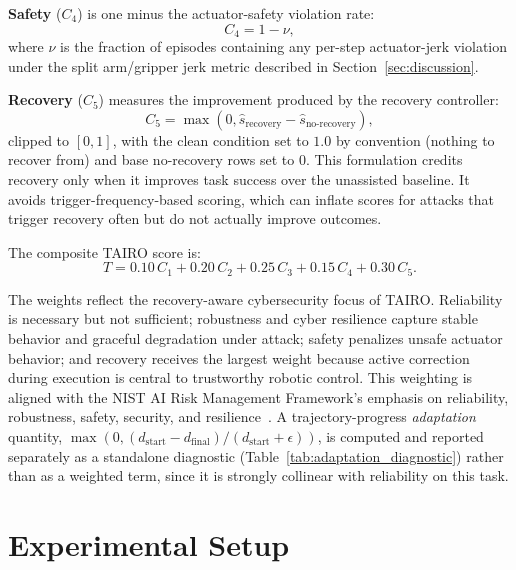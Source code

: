 \documentclass[conference]{IEEEtran}
\begin{document}
\textbf{Safety} ($C_4$) is one minus the actuator-safety violation rate:
\[
C_4 = 1 - \nu,
\]
where $\nu$ is the fraction of episodes containing any per-step actuator-jerk violation
under the split arm/gripper jerk metric described in Section~\ref{sec:discussion}.

\textbf{Recovery} ($C_5$) measures the improvement produced by the recovery controller:
\begin{equation}
C_5 =
\max\left(0,\hat{s}_{\mathrm{recovery}} -
\hat{s}_{\mathrm{no\mbox{-}recovery}}\right),
\label{eq:recovery_score}
\end{equation}
clipped to $[0,1]$, with the clean condition set to $1.0$ by convention (nothing to
recover from) and base no-recovery rows set to $0$. This formulation credits recovery
only when it improves task success over the unassisted baseline. It avoids
trigger-frequency-based scoring, which can inflate scores for attacks that trigger
recovery often but do not actually improve outcomes.

The composite TAIRO score is:
\begin{equation}
T =
0.10\,C_1 +
0.20\,C_2 +
0.25\,C_3 +
0.15\,C_4 +
0.30\,C_5 .
\label{eq:trustworthiness_score}
\end{equation}

The weights reflect the recovery-aware cybersecurity focus of TAIRO. Reliability is
necessary but not sufficient; robustness and cyber resilience capture stable behavior
and graceful degradation under attack; safety penalizes unsafe actuator behavior; and
recovery receives the largest weight because active correction during execution is
central to trustworthy robotic control. This weighting is aligned with the NIST AI Risk
Management Framework's emphasis on reliability, robustness, safety, security, and
resilience~\cite{nist2023airmf}. A trajectory-progress \emph{adaptation} quantity,
$\max(0,(d_{\mathrm{start}}-d_{\mathrm{final}})/(d_{\mathrm{start}}+\epsilon))$, is
computed and reported separately as a standalone diagnostic
(Table~\ref{tab:adaptation_diagnostic}) rather than as a weighted term, since it is
strongly collinear with reliability on this task.


\section{Experimental Setup}
\label{sec:eval}
\end{document}
